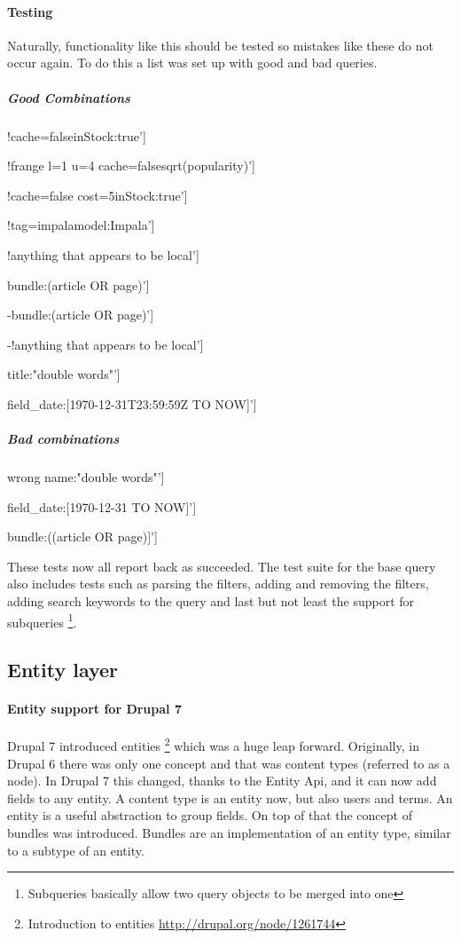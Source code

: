 \paragraph{Testing}
Naturally, functionality like this should be tested so mistakes like these do not occur again. To do this a list was set up with good and bad queries.

\subparagraph{Good Combinations}
\begin{packed_itemize}
\item {!cache=false}inStock:true']
\item {!frange l=1 u=4 cache=false}sqrt(popularity)']
\item {!cache=false cost=5}inStock:true']
\item {!tag=impala}model:Impala']
\item {!anything that appears to be local}']
\item bundle:(article OR page)']
\item -bundle:(article OR page)']
\item -{!anything that appears to be local}']
\item title:"double words"']
\item field\_date:[1970-12-31T23:59:59Z TO NOW]'] 
\end{packed_itemize}

\subparagraph{Bad combinations}
\begin{packed_itemize}
\item wrong name:"double words"']
\item field\_date:[1970-12-31 TO NOW]']
\item bundle:((article OR page)]']
\end{packed_itemize}

These tests now all report back as succeeded. The test suite for the base query also includes tests such as parsing the filters, adding and removing the filters, adding search keywords to the query and last but not least the support for subqueries \footnote{Subqueries basically allow two query objects to be merged into one}.

\subsection{Entity layer}
\paragraph{Entity support for Drupal 7}
Drupal 7 introduced entities \footnote{Introduction to entities \url{http://drupal.org/node/1261744}} which was a huge leap forward. Originally, in Drupal 6 there was only one concept and that was content types (referred to as a node). In Drupal 7 this changed, thanks to the Entity Api, and it can now add fields to any entity. A content type is an entity now, but also users and terms. An entity is a useful abstraction to group fields. On top of that the concept of bundles was introduced. Bundles are an implementation of an entity type, similar to a subtype of an entity.

